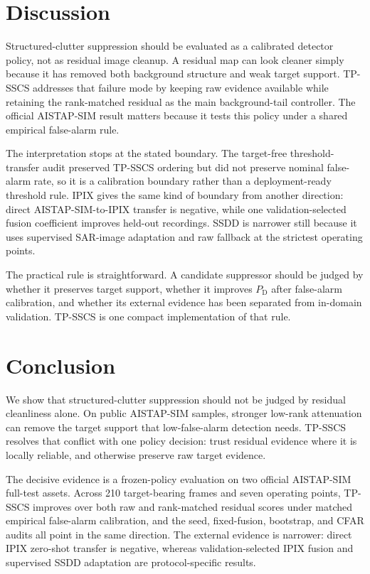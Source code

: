 \documentclass[journal]{IEEEtran}
\begin{document}
\section{Discussion}

Structured-clutter suppression should be evaluated as a calibrated detector policy, not as residual image cleanup. A residual map can look cleaner simply because it has removed both background structure and weak target support. TP-SSCS addresses that failure mode by keeping raw evidence available while retaining the rank-matched residual as the main background-tail controller. The official AISTAP-SIM result matters because it tests this policy under a shared empirical false-alarm rule.

The interpretation stops at the stated boundary. The target-free threshold-transfer audit preserved TP-SSCS ordering but did not preserve nominal false-alarm rate, so it is a calibration boundary rather than a deployment-ready threshold rule. IPIX gives the same kind of boundary from another direction: direct AISTAP-SIM-to-IPIX transfer is negative, while one validation-selected fusion coefficient improves held-out recordings. SSDD is narrower still because it uses supervised SAR-image adaptation and raw fallback at the strictest operating points.

The practical rule is straightforward. A candidate suppressor should be judged by whether it preserves target support, whether it improves $P_{\mathrm{D}}$ after false-alarm calibration, and whether its external evidence has been separated from in-domain validation. TP-SSCS is one compact implementation of that rule.

\section{Conclusion}

We show that structured-clutter suppression should not be judged by residual cleanliness alone. On public AISTAP-SIM samples, stronger low-rank attenuation can remove the target support that low-false-alarm detection needs. TP-SSCS resolves that conflict with one policy decision: trust residual evidence where it is locally reliable, and otherwise preserve raw target evidence.

The decisive evidence is a frozen-policy evaluation on two official AISTAP-SIM full-test assets. Across 210 target-bearing frames and seven operating points, TP-SSCS improves over both raw and rank-matched residual scores under matched empirical false-alarm calibration, and the seed, fixed-fusion, bootstrap, and CFAR audits all point in the same direction. The external evidence is narrower: direct IPIX zero-shot transfer is negative, whereas validation-selected IPIX fusion and supervised SSDD adaptation are protocol-specific results.
\end{document}
